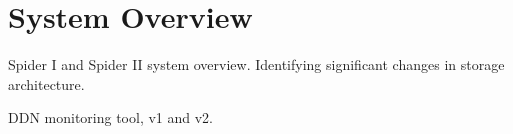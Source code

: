 \section{System Overview}
\label{sec:overview}

Spider I and Spider II system overview. Identifying significant changes in storage architecture.

DDN monitoring tool, v1 and v2. 



